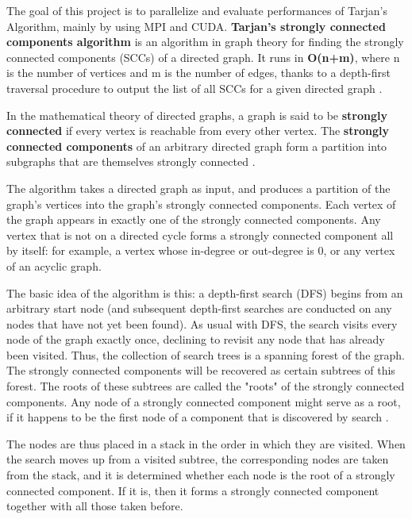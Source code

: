 \label{alg:tarjan_theorical}
The goal of this project is to parallelize and evaluate performances of Tarjan's Algorithm, mainly by using MPI and CUDA. 
\textbf{Tarjan's strongly connected components algorithm} is an algorithm in graph theory for finding the strongly connected components (SCCs) of a directed graph.
It runs in \textbf{O(n+m)}, where n is the number of vertices and m is the number of edges, thanks to a depth-first traversal procedure to output the list of all SCCs for a given directed graph \cite{doi:10.1137/0201010}.

In the mathematical theory of directed graphs, a graph is said to be \textbf{strongly connected} if every vertex is reachable from every other vertex.
The \textbf{strongly connected components} of an arbitrary directed graph form a partition into subgraphs that are themselves strongly connected \cite{wiki:SCC}.

The algorithm takes a directed graph as input, and produces a partition of the graph's vertices into the graph's strongly connected components. 
Each vertex of the graph appears in exactly one of the strongly connected components. Any vertex that is not on a directed cycle forms a strongly connected component all by itself: for example, a vertex whose in-degree or out-degree is 0, or any vertex of an acyclic graph.

The basic idea of the algorithm is this: a depth-first search (DFS) begins from an arbitrary start node (and subsequent depth-first searches are conducted on any nodes that have not yet been found).
As usual with DFS, the search visits every node of the graph exactly once, declining to revisit any node that has already been visited. Thus, the collection of search trees is a spanning forest of the graph.
The strongly connected components will be recovered as certain subtrees of this forest. The roots of these subtrees are called the "roots" of the strongly connected components.
Any node of a strongly connected component might serve as a root, if it happens to be the first node of a component that is discovered by search \cite{wiki:Tarjan}.

The nodes are thus placed in a stack in the order in which they are visited. When the search moves up from a visited subtree, the corresponding nodes are taken from the stack, and it is determined whether each node is the root of a strongly connected component.
If it is, then it forms a strongly connected component together with all those taken before.

